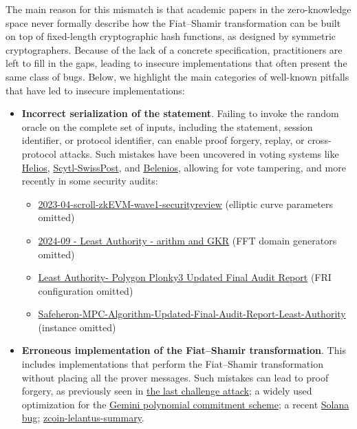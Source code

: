 \documentclass{article}
\begin{document}
The main reason for this mismatch is that academic papers in the zero-knowledge space never formally describe how the Fiat--Shamir transformation can be built on top of fixed-length cryptographic hash functions, as designed by symmetric cryptographers. Because of the lack of a concrete specification, practitioners are left to fill in the gaps, leading to insecure implementations that often present the same class of bugs. Below, we highlight the main categories of well-known pitfalls that have led to insecure implementations:

\begin{itemize}
    \item \textbf{Incorrect serialization of the statement}. Failing to invoke the random oracle on the complete set of inputs, including the statement, session identifier, or protocol identifier, can enable proof forgery, replay, or cross-protocol attacks. Such mistakes have been uncovered in voting systems like \href{https://eprint.iacr.org/2016/771}{Helios}, \href{https://ieeexplore.ieee.org/document/9152765}{Scytl-SwissPost}, and \href{https://inria.hal.science/hal-02928953/file/final.pdf}{Belenios}, allowing for vote tampering, and more recently in some security audits:
    \begin{itemize}
    \item
\href{https://github.com/trailofbits/publications/blob/master/reviews/2023-04-scroll-zkEVM-wave1-securityreview.pdf}{\textsf{2023-04-scroll-zkEVM-wave1-securityreview}} (elliptic curve parameters omitted)
\item \href{https://github.com/Consensys/gnark/blob/master/audits/2024-09\%20-\%20Least\%20Authority\%20-\%20arithm\%20and\%20GKR.pdf}{\textsf{2024-09 - Least Authority - arithm and GKR}} (FFT domain generators omitted)
\item \href{https://leastauthority.com/wp-content/uploads/2024/11/Updated\_071124\_Polygon\_Plonky3\_Final\_Audit\_Report.pdf}{\textsf{Least Authority- Polygon Plonky3 Updated Final Audit Report}} (FRI configuration omitted)
\item \href{https://leastauthority.com/wp-content/uploads/2023/10/Safeheron_MPC_Algorithm_Updated_Final_Audit_Report_Least_Authority.pdf}{\textsf{Safeheron-MPC-Algorithm-Updated-Final-Audit-Report-Least-Authority}} (instance omitted)
    \end{itemize}
    \item \textbf{Erroneous implementation of the Fiat--Shamir transformation}. This includes implementations that perform the Fiat--Shamir transformation without placing all the prover messages. Such mistakes can lead to proof forgery, as previously seen in \href{https://www.youtube.com/watch?v=Sk-S8-n6Jo4}{the last challenge attack}; a widely used optimization for the \href{https://eprint.iacr.org/2025/565}{Gemini polynomial commitment scheme}; a recent \href{https://t.co/RFaHQOtAAq}{Solana bug};
    \href{https://github.com/trailofbits/publications/blob/master/reviews/zcoin-lelantus-summary}{zcoin-lelantus-summary}.


\end{itemize}
\end{document}
